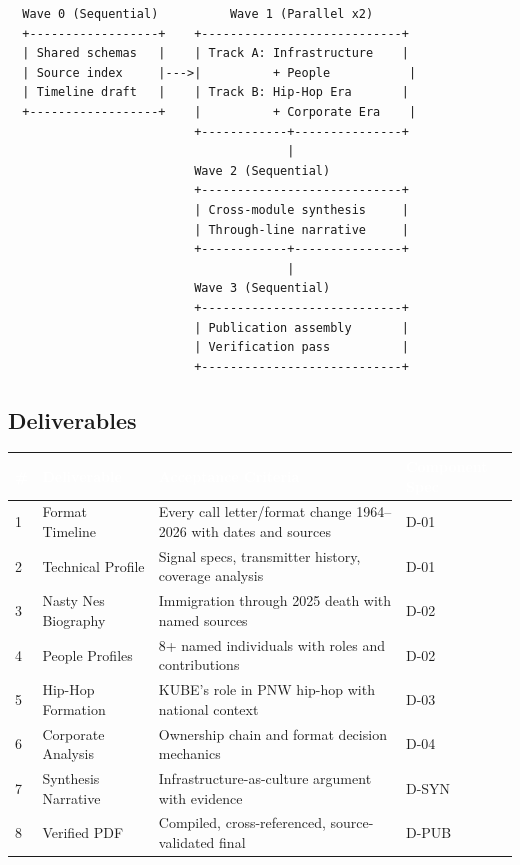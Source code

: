 \documentclass[11pt,letterpaper]{article}
\newcommand{\tableheader}[1]{\textbf{\sffamily\textcolor{white}{#1}}}
\begin{document}
\begin{asciibox}
\begin{verbatim}
  Wave 0 (Sequential)          Wave 1 (Parallel x2)
  +------------------+    +----------------------------+
  | Shared schemas   |    | Track A: Infrastructure    |
  | Source index     |--->|          + People           |
  | Timeline draft   |    | Track B: Hip-Hop Era       |
  +------------------+    |          + Corporate Era    |
                          +------------+---------------+
                                       |
                          Wave 2 (Sequential)
                          +----------------------------+
                          | Cross-module synthesis     |
                          | Through-line narrative     |
                          +------------+---------------+
                                       |
                          Wave 3 (Sequential)
                          +----------------------------+
                          | Publication assembly       |
                          | Verification pass          |
                          +----------------------------+
\end{verbatim}
\end{asciibox}

\subsection{Deliverables}

\begin{center}
\begin{tabularx}{\textwidth}{C{0.5cm}L{3cm}XL{2.5cm}}
\toprule
{}
\tableheader{\#} & \tableheader{Deliverable} & \tableheader{Acceptance Criteria} & \tableheader{Component Spec} \\
 & Format Timeline & Every call letter/format change 1964--2026 with dates and sources & D-01 \\
2 & Technical Profile & Signal specs, transmitter history, coverage analysis & D-01 \\
3 & Nasty Nes Biography & Immigration through 2025 death with named sources & D-02 \\
4 & People Profiles & 8+ named individuals with roles and contributions & D-02 \\
5 & Hip-Hop Formation & KUBE's role in PNW hip-hop with national context & D-03 \\
6 & Corporate Analysis & Ownership chain and format decision mechanics & D-04 \\
7 & Synthesis Narrative & Infrastructure-as-culture argument with evidence & D-SYN \\
8 & Verified PDF & Compiled, cross-referenced, source-validated final & D-PUB \\
\bottomrule
\end{tabularx}
\end{center}
\end{document}
